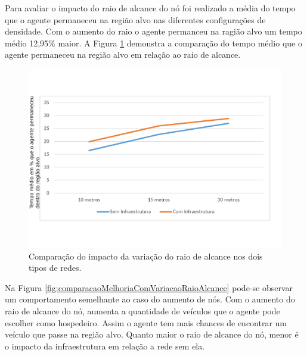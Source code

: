 Para avaliar o impacto do raio de alcance do nó foi realizado a média do tempo que o agente permaneceu na região alvo nas diferentes configurações de densidade. Com o aumento do raio o agente permanceu na ragião alvo um tempo médio 12,95\% maior. A Figura \ref{fig:comparacaoVariacaoRaioAlcance} demonstra a comparação do tempo médio que o agente permaneceu na região alvo em relação ao raio de alcance.

\begin{figure}[htbp]
	\centering
	\includegraphics[scale=0.34]{resultados/graficos/comparacaoVariacaoRaioAlcance.pdf}
	\caption{Comparação do impacto da variação do raio de alcance nos dois tipos de redes.}
	\label{fig:comparacaoVariacaoRaioAlcance}
\end{figure}

Na Figura \ref{fig:comparacaoMelhoriaComVariacaoRaioAlcance} pode-se observar um comportamento semelhante ao caso do aumento de nós. Com o aumento do raio de alcance do nó, aumenta a quantidade de veículos que o agente pode escolher como hospedeiro. Assim o agente tem mais chances de encontrar um veículo que passe na região alvo. Quanto maior o raio de alcance do nó, menor é o impacto da infraestrutura em relação a rede sem ela.

